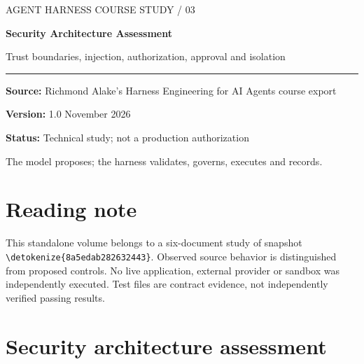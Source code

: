 \documentclass[11pt,letterpaper]{article}
\newcommand{\src}[1]{\expandafter\nolinkurl\expandafter{\detokenize{#1}}}
\begin{document}
\begin{titlepage}
\vspace*{1.25in}
{\color{teal}\large AGENT HARNESS COURSE STUDY / 03\par}\vspace{.3in}
{\color{navy}\Huge\bfseries Security Architecture Assessment\par}\vspace{.18in}
{\Large Trust boundaries, injection, authorization, approval and isolation\par}\vspace{.5in}
\rule{\linewidth}{1pt}\par
\textbf{Source:} Richmond Alake's Harness Engineering for AI Agents course export\par
\textbf{Version:} 1.0  November 2026\par
\textbf{Status:} Technical study; not a production authorization\par
\vfill
The model proposes; the harness validates, governs, executes and records.
\end{titlepage}
\tableofcontents\clearpage
\section*{Reading note}
This standalone volume belongs to a six-document study of snapshot \src{8a5edab282632443}. Observed source behavior is distinguished from proposed controls. No live application, external provider or sandbox was independently executed. Test files are contract evidence, not independently verified passing results.

\section{Security architecture assessment}
\end{document}
